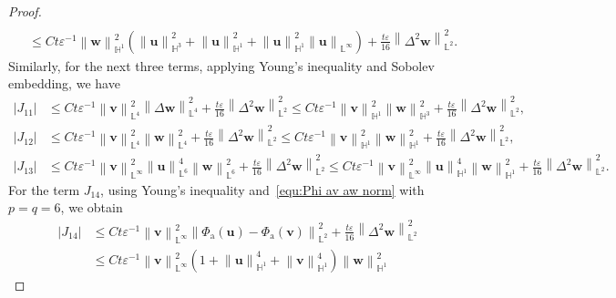 \documentclass[11pt, reqno]{amsart}
\theoremstyle{definition}
\numberwithin{equation}{section}
\newcommand{\bff}{\boldsymbol}
\newcommand{\bb}{\mathbb}
\newcommand{\norm}[2]{\left\|{#1}\right\|_{#2}}
\newcommand{\abs}[1]{\left|{#1}\right|}
\begin{document}
\begin{proof}
\begin{align*}
    \\
    &\leq
    Ct\varepsilon^{-1} \norm{\bff{w}}{\bb{H}^1}^2 \left(\norm{\bff{u}}{\bb{H}^3}^2 + \norm{\bff{u}}{\bb{H}^1}^2 + \norm{\bff{u}}{\bb{H}^1}^2 \norm{\bff{u}}{\bb{L}^\infty} \right)
    + \frac{t\varepsilon}{16} \norm{\Delta^2 \bff{w}}{\bb{L}^2}^2.
\end{align*}
Similarly, for the next three terms, applying Young's inequality and Sobolev embedding, we have
\begin{align*}
    \abs{J_{11}}
    &\leq
    Ct\varepsilon^{-1} \norm{\bff{v}}{\bb{L}^4}^2 \norm{\Delta\bff{w}}{\bb{L}^4}^2
    +
    \frac{t\varepsilon}{16} \norm{\Delta^2 \bff{w}}{\bb{L}^2}^2
    \leq
    Ct\varepsilon^{-1} \norm{\bff{v}}{\bb{H}^1}^2 \norm{\bff{w}}{\bb{H}^3}^2
    +
    \frac{t\varepsilon}{16} \norm{\Delta^2 \bff{w}}{\bb{L}^2}^2,
    \\
    \abs{J_{12}}
    &\leq
    Ct \varepsilon^{-1} \norm{\bff{v}}{\bb{L}^4}^2 \norm{\bff{w}}{\bb{L}^4}^2
    +
    \frac{t\varepsilon}{16} \norm{\Delta^2 \bff{w}}{\bb{L}^2}^2
    \leq
    Ct\varepsilon^{-1} \norm{\bff{v}}{\bb{H}^1}^2 \norm{\bff{w}}{\bb{H}^1}^2
    +
    \frac{t\varepsilon}{16} \norm{\Delta^2 \bff{w}}{\bb{L}^2}^2,
    \\
    \abs{J_{13}}
    &\leq
    Ct\varepsilon^{-1} \norm{\bff{v}}{\bb{L}^\infty}^2 \norm{\bff{u}}{\bb{L}^6}^4 \norm{\bff{w}}{\bb{L}^6}^2 
    +
    \frac{t\varepsilon}{16} \norm{\Delta^2 \bff{w}}{\bb{L}^2}^2
    \leq
    Ct\varepsilon^{-1} \norm{\bff{v}}{\bb{L}^\infty}^2 \norm{\bff{u}}{\bb{H}^1}^4 \norm{\bff{w}}{\bb{H}^1}^2 
    +
    \frac{t\varepsilon}{16} \norm{\Delta^2 \bff{w}}{\bb{L}^2}^2.
\end{align*}
For the term $J_{14}$, using Young's inequality and~\eqref{equ:Phi av aw norm} with $p=q=6$, we obtain
\begin{align*}
    \abs{J_{14}}
    &\leq
    Ct\varepsilon^{-1} \norm{\bff{v}}{\bb{L}^\infty}^2 \norm{\Phi_{\mathrm{a}}(\bff{u})-\Phi_{\mathrm{a}}(\bff{v})}{\bb{L}^2}^2 
    +
    \frac{t\varepsilon}{16} \norm{\Delta^2 \bff{w}}{\bb{L}^2}^2
    \\
    &\leq
    Ct\varepsilon^{-1} \norm{\bff{v}}{\bb{L}^\infty}^2 \left(1+ \norm{\bff{u}}{\bb{H}^1}^4 + \norm{\bff{v}}{\bb{H}^1}^4\right) \norm{\bff{w}}{\bb{H}^1}^2

\end{align*}
\end{proof}
\end{document}
